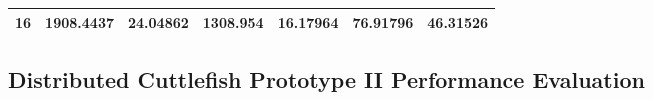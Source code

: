 \begin{table}[]
\begin{tabular}{|l|l|l|l|l|l|l|}
16                                                                                  & 1908.4437                                                                                                                   & 24.04862                                                                                                                                        & 1308.954                                                                                                                                        & 16.17964                                                                                                                                         & 76.91796                                                                                                                                     & 46.31526                                                                                                                                       \\ \hline
\end{tabular}
\end{table}


\subsection{Distributed Cuttlefish Prototype II Performance Evaluation} \label{ProtoIIDesigns}

